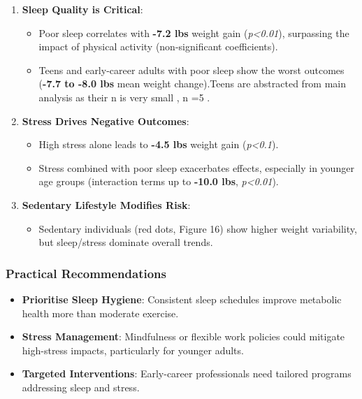 \documentclass[
  man,floatsintext]{apa6}
\providecommand{\tightlist}{%
  \setlength{\itemsep}{0pt}\setlength{\parskip}{0pt}}
\begin{document}
\begin{enumerate}
\def\labelenumi{\arabic{enumi}.}
\tightlist
\item
  \textbf{Sleep Quality is Critical}:

  \begin{itemize}
  \tightlist
  \item
    Poor sleep correlates with \textbf{-7.2 lbs} weight gain (\emph{p\textless0.01}), surpassing the impact of physical activity (non-significant coefficients).\\
  \item
    Teens and early-career adults with poor sleep show the worst outcomes (\textbf{-7.7 to -8.0 lbs} mean weight change).Teens are abstracted from main analysis as their n is very small , n =5 .
  \end{itemize}
\item
  \textbf{Stress Drives Negative Outcomes}:

  \begin{itemize}
  \tightlist
  \item
    High stress alone leads to \textbf{-4.5 lbs} weight gain (\emph{p\textless0.1}).\\
  \item
    Stress combined with poor sleep exacerbates effects, especially in younger age groups (interaction terms up to \textbf{-10.0 lbs}, \emph{p\textless0.01}).
  \end{itemize}
\item
  \textbf{Sedentary Lifestyle Modifies Risk}:

  \begin{itemize}
  \tightlist
  \item
    Sedentary individuals (red dots, Figure 16) show higher weight variability, but sleep/stress dominate overall trends.
  \end{itemize}
\end{enumerate}

\subsubsection{\texorpdfstring{\textbf{Practical Recommendations}}{Practical Recommendations}}\label{practical-recommendations}

\begin{itemize}
\tightlist
\item
  \textbf{Prioritise Sleep Hygiene}: Consistent sleep schedules improve metabolic health more than moderate exercise.\\
\item
  \textbf{Stress Management}: Mindfulness or flexible work policies could mitigate high-stress impacts, particularly for younger adults.\\
\item
  \textbf{Targeted Interventions}: Early-career professionals need tailored programs addressing sleep and stress.
\end{itemize}
\end{document}
